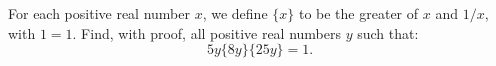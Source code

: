 For each positive real number $x$, we define $\{x\}$ to be the greater of $x$ and $1/x$, with ${1} = 1$. Find, with proof, all positive real numbers $y$ such that:
$$5y\{8y\}\{25y\} = 1.$$